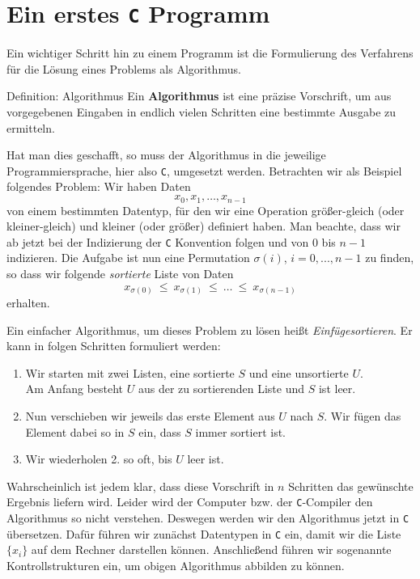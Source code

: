 \section{Ein erstes \texttt{C} Programm}

Ein wichtiger Schritt hin zu einem Programm ist die Formulierung des Verfahrens für die Lösung eines Problems als Algorithmus.
\begin{myblock}{Definition: Algorithmus}
Ein \textbf{Algorithmus} ist eine präzise Vorschrift, um aus vorgegebenen
Eingaben in endlich vielen Schritten eine bestimmte Ausgabe zu
ermitteln.
\end{myblock}
Hat man dies geschafft, so muss der Algorithmus in die jeweilige Programmiersprache, hier also \texttt{C}, umgesetzt werden.
Betrachten wir als Beispiel folgendes Problem:
Wir haben Daten
\[
x_0, x_1,\ldots,x_{n-1}
\]
von einem bestimmten Datentyp, für den wir eine Operation größer-gleich (oder kleiner-gleich) und kleiner (oder größer) definiert haben.
Man beachte, dass wir ab jetzt bei der Indizierung der \texttt{C} Konvention folgen und von $0$ bis $n-1$ indizieren.
Die Aufgabe ist nun eine Permutation $\sigma(i)$, $i=0,...,n-1$ zu finden, so dass wir folgende \emph{sortierte} Liste von Daten
\[
x_{\sigma(0)}\ \leq\ x_{\sigma(1)}\ \leq\ \ldots\ \leq\ x_{\sigma(n-1)}
\]
erhalten.

Ein einfacher Algorithmus, um dieses Problem zu lösen heißt \emph{Einfügesortieren}.
Er kann in folgen Schritten formuliert werden:
\begin{enumerate}
\item Wir starten mit zwei Listen, eine sortierte $S$ und eine unsortierte $U$.\\
  Am Anfang besteht $U$ aus der zu sortierenden Liste und $S$ ist leer.
\item Nun verschieben wir jeweils das erste Element aus $U$ nach $S$.
  Wir fügen das Element dabei so in $S$ ein, dass $S$ immer sortiert ist.
 \item Wir wiederholen 2. so oft, bis $U$ leer ist.
\end{enumerate}
Wahrscheinlich ist jedem klar, dass diese Vorschrift in $n$ Schritten das gewünschte Ergebnis liefern wird.
Leider wird der Computer bzw. der \texttt{C}-Compiler den Algorithmus so nicht verstehen.
Deswegen werden wir den Algorithmus jetzt in \texttt{C} übersetzen.
Dafür führen wir zunächst Datentypen in \texttt{C} ein, damit wir die Liste $\{x_i\}$ auf dem Rechner darstellen können. 
Anschließend führen wir sogenannte Kontrollstrukturen ein, um obigen Algorithmus abbilden zu können.

